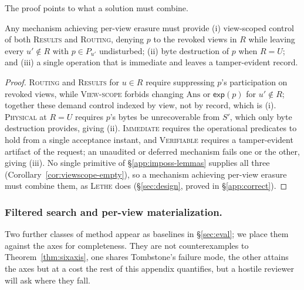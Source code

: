 \documentclass[sigconf, nonacm, review]{acmart}
\begin{document}
The proof points to what a solution must combine.

\begin{lemma}
\label{lem:combination}
Any mechanism achieving per-view erasure must provide (i) view-scoped control
of both \textsc{Results} and \textsc{Routing}, denying $p$ to the revoked
views in $R$ while leaving every $u'\notin R$ with $p\in P_{u'}$ undisturbed;
(ii) byte destruction of $p$ when $R=U$; and (iii) a single operation that is
immediate and leaves a tamper-evident record.
\end{lemma}
\begin{proof}
\textsc{Routing} and \textsc{Results} for $u\in R$ require suppressing $p$'s
participation on revoked views, while \textsc{View-scope} forbids changing
$\mathrm{Ans}$ or $\mathsf{exp}(p)$ for $u'\notin R$; together these demand
control indexed by view, not by record, which is (i). \textsc{Physical} at
$R=U$ requires $p$'s bytes be unrecoverable from $S'$, which only byte
destruction provides, giving (ii). \textsc{Immediate} requires the operational
predicates to hold from a single acceptance instant, and \textsc{Verifiable}
requires a tamper-evident artifact of the request; an unaudited or deferred
mechanism fails one or the other, giving (iii). No single primitive of
\S\ref{app:imposs-lemmas} supplies all three (Corollary~\ref{cor:viewscope-empty}),
so a mechanism achieving per-view erasure must combine them, as \textsc{Lethe}
does (\S\ref{sec:design}, proved in \S\ref{app:correct}).
\end{proof}

\subsubsection{Filtered search and per-view materialization.}
\label{app:imposs-extra}
Two further classes of method appear as baselines in \S\ref{sec:eval}; we
place them against the axes for completeness. They are not counterexamples to
Theorem~\ref{thm:sixaxis}, one shares Tombstone's failure mode, the other
attains the axes but at a cost the rest of this appendix quantifies, but a
hostile reviewer will ask where they fall.
\end{document}
